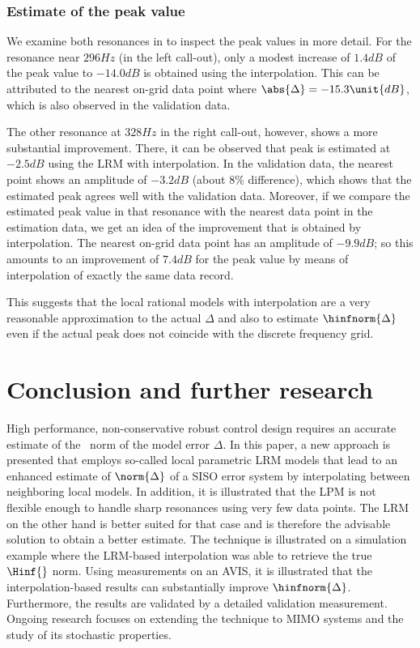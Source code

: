 \subsubsection{Estimate of the peak value}
We examine both resonances in  to inspect the peak values in more detail.
For the resonance near $296\unit{Hz}$ (in the left call-out), only a modest increase of $1.4\unit{dB}$ of the peak value to $-14.0 \unit{dB}$ is obtained using the interpolation.
This can be attributed to the nearest on-grid data point where $\abs{\Delta} = -15.3 \unit{dB}$, which is also observed in the validation data.

The other resonance at $328\unit{Hz}$ in the right call-out, however, shows a more substantial improvement.
There, it can be observed that peak is estimated at $-2.5\unit{dB}$ using the \gls{LRM} with interpolation.
In the validation data, the nearest point shows an amplitude of $-3.2\unit{dB}$ (about $8\%$ difference), which shows that the estimated peak agrees well with the validation data.
Moreover, if we compare the estimated peak value in that resonance with the nearest data point in the estimation data, we get an idea of the improvement that is obtained by interpolation.
The nearest on-grid data point has an amplitude of $-9.9 \unit{dB}$; so this amounts to an improvement of $7.4\unit{dB}$ for the peak value by means of interpolation of exactly the same data record.

This suggests that the local rational models with interpolation are a very reasonable approximation to the actual $\Delta$ and also to estimate $\hinfnorm{\Delta}$ even if the actual peak does not coincide with the discrete frequency grid.

\section{Conclusion and further research}
\label{sec:conclusion}
High performance, non-conservative robust control design requires an accurate estimate of the \Hinf\ norm of the model error $\Delta$.
In this paper, a new approach is presented that employs so-called local parametric \gls{LRM} models that lead to an enhanced estimate of $\norm{\Delta}$ of a \gls{SISO} error system by interpolating between neighboring local models. 
In addition, it is illustrated that the \gls{LPM} is not flexible enough to handle sharp resonances using very few data points.
The \gls{LRM} on the other hand is better suited for that case and is therefore the advisable solution to obtain a better estimate.
The technique is illustrated on a simulation example where the \gls{LRM}-based interpolation was able to retrieve the true $\Hinf{}$ norm.
Using measurements on an \gls{AVIS}, it is illustrated that the interpolation-based results can substantially improve $\hinfnorm{\Delta}$.
Furthermore, the results are validated by a detailed validation measurement. 
Ongoing research focuses on extending the technique to \gls{MIMO} systems and the study of its stochastic properties.


 
%


